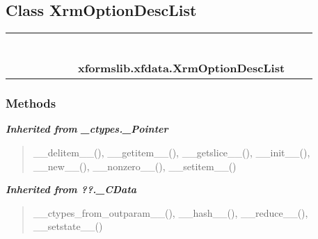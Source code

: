 \subsection{Class XrmOptionDescList}

    \label{xformslib:xfdata:XrmOptionDescList}
\begin{tabular}{cccccccccc}
\multicolumn{2}{r}{\settowidth{\BCL}{object}\multirow{2}{\BCL}{object}}
&&
&&
&&
  \\\cline{3-3}
  &&\multicolumn{1}{c|}{}
&&
&&
&&
  \\
\multicolumn{4}{r}{\settowidth{\BCL}{??.\_CData}\multirow{2}{\BCL}{??.\_CData}}
&&
&&
  \\\cline{5-5}
  &&&&\multicolumn{1}{c|}{}
&&
&&
  \\
\multicolumn{6}{r}{\settowidth{\BCL}{\_ctypes.\_Pointer}\multirow{2}{\BCL}{\_ctypes.\_Pointer}}
&&
  \\\cline{7-7}
  &&&&&&\multicolumn{1}{c|}{}
&&
  \\
&&&&&&\multicolumn{2}{l}{\textbf{xformslib.xfdata.XrmOptionDescList}}
\end{tabular}



  \subsubsection{Methods}


\large{\textbf{\textit{Inherited from \_ctypes.\_Pointer}}}

\begin{quote}
\_\_delitem\_\_(), \_\_getitem\_\_(), \_\_getslice\_\_(), \_\_init\_\_(), \_\_new\_\_(), \_\_nonzero\_\_(), \_\_setitem\_\_()
\end{quote}

\large{\textbf{\textit{Inherited from ??.\_CData}}}

\begin{quote}
\_\_ctypes\_from\_outparam\_\_(), \_\_hash\_\_(), \_\_reduce\_\_(), \_\_setstate\_\_()
\end{quote}

